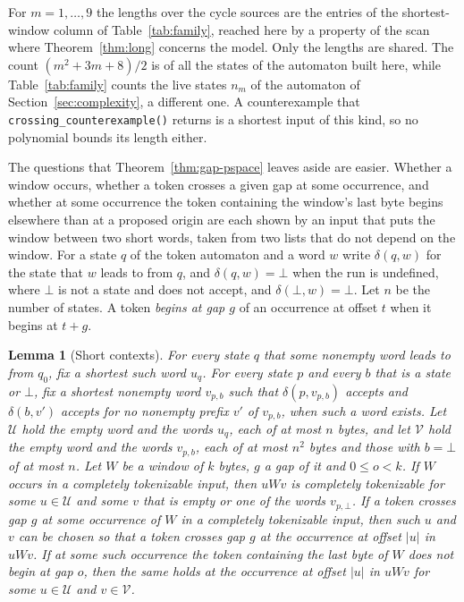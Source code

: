 \documentclass[11pt,a4paper]{article}
\theoremstyle{definition}
\theoremstyle{plain}
\newtheorem{lemma}{Lemma}
\newcommand{\code}[1]{\texttt{#1}}
\begin{document}
For $m = 1, \ldots, 9$ the lengths over the cycle sources are the entries of the shortest-window column of
Table~\ref{tab:family}, reached here by a property of the scan where Theorem~\ref{thm:long} concerns the model. Only the
lengths are shared. The count $(m^2 + 3m + 8)/2$ is of all the states of the automaton built here, while
Table~\ref{tab:family} counts the live states $n_m$ of the automaton of Section~\ref{sec:complexity}, a different one. A
counterexample that \code{crossing\_counterexample()} returns is a shortest input of this kind, so no polynomial bounds
its length either.

The questions that Theorem~\ref{thm:gap-pspace} leaves aside are easier. Whether a window occurs, whether a token
crosses a given gap at some occurrence, and whether at some occurrence the token containing the window's last byte
begins elsewhere than at a proposed origin are each shown by an input that puts the window between two short words,
taken from two lists that do not depend on the window. For a state $q$ of the token automaton and a word $w$ write
$\delta(q, w)$ for the state that $w$ leads to from $q$, and $\delta(q, w) = \bot$ when the run is undefined, where
$\bot$ is not a state and does not accept, and $\delta(\bot, w) = \bot$. Let $n$ be the number of states. A token
\emph{begins at gap $g$} of an occurrence at offset $t$ when it begins at $t + g$.

\begin{lemma}[Short contexts]
\label{lem:contexts}
For every state $q$ that some nonempty word leads to from $q_0$, fix a shortest such word $u_q$. For every state $p$ and
every $b$ that is a state or $\bot$, fix a shortest nonempty word $v_{p,b}$ such that $\delta(p, v_{p,b})$ accepts and
$\delta(b, v')$ accepts for no nonempty prefix $v'$ of $v_{p,b}$, when such a word exists. Let $\mathcal{U}$ hold the
empty word and the words $u_q$, each of at most $n$ bytes, and let $\mathcal{V}$ hold the empty word and the words
$v_{p,b}$, each of at most $n^2$ bytes and those with $b = \bot$ of at most $n$. Let $W$ be a window of $k$ bytes, $g$ a
gap of it and $0 \leq o < k$. If $W$ occurs in a completely tokenizable input, then $u W v$ is completely tokenizable
for some $u \in \mathcal{U}$ and some $v$ that is empty or one of the words $v_{p,\bot}$. If a token crosses gap $g$ at
some occurrence of $W$ in a completely tokenizable input, then such $u$ and $v$ can be chosen so that a token crosses
gap $g$ at the occurrence at offset $|u|$ in $u W v$. If at some such occurrence the token containing the last byte of
$W$ does not begin at gap $o$, then the same holds at the occurrence at offset $|u|$ in $u W v$ for some
$u \in \mathcal{U}$ and $v \in \mathcal{V}$.
\end{lemma}
\end{document}
